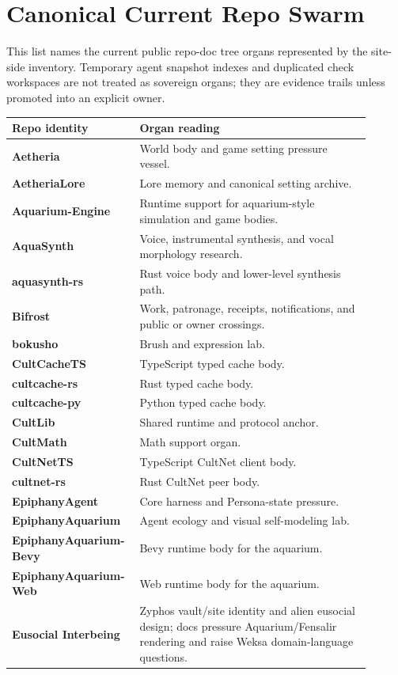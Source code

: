 \documentclass[11pt,oneside]{article}
\begin{document}
\section{Canonical Current Repo Swarm}

This list names the current public repo-doc tree organs represented by the
site-side inventory. Temporary agent snapshot indexes and duplicated check
workspaces are not treated as sovereign organs; they are evidence trails unless
promoted into an explicit owner.

\begin{longtable}{>{\bfseries}p{0.28\linewidth}p{0.62\linewidth}}
\toprule
Repo identity & Organ reading\\
\midrule
Aetheria & World body and game setting pressure vessel.\\
AetheriaLore & Lore memory and canonical setting archive.\\
Aquarium-Engine & Runtime support for aquarium-style simulation and game bodies.\\
AquaSynth & Voice, instrumental synthesis, and vocal morphology research.\\
aquasynth-rs & Rust voice body and lower-level synthesis path.\\
Bifrost & Work, patronage, receipts, notifications, and public or owner crossings.\\
bokusho & Brush and expression lab.\\
CultCacheTS & TypeScript typed cache body.\\
cultcache-rs & Rust typed cache body.\\
cultcache-py & Python typed cache body.\\
CultLib & Shared runtime and protocol anchor.\\
CultMath & Math support organ.\\
CultNetTS & TypeScript CultNet client body.\\
cultnet-rs & Rust CultNet peer body.\\
EpiphanyAgent & Core harness and Persona-state pressure.\\
EpiphanyAquarium & Agent ecology and visual self-modeling lab.\\
EpiphanyAquarium-Bevy & Bevy runtime body for the aquarium.\\
EpiphanyAquarium-Web & Web runtime body for the aquarium.\\
Eusocial Interbeing & Zyphos vault/site identity and alien eusocial design; docs pressure Aquarium/Fensalir rendering and raise Weksa domain-language questions.\\

\end{longtable}
\end{document}

